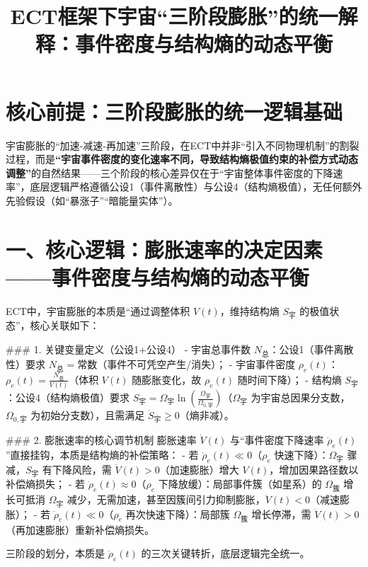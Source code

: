 \documentclass{article}
\title{ECT框架下宇宙“三阶段膨胀”的统一解释：事件密度与结构熵的动态平衡}
\author{}
\date{}
\begin{document}
\maketitle

\section*{核心前提：三阶段膨胀的统一逻辑基础}
宇宙膨胀的“加速-减速-再加速”三阶段，在ECT中并非“引入不同物理机制”的割裂过程，而是\textbf{“宇宙事件密度的变化速率不同，导致结构熵极值约束的补偿方式动态调整”}的自然结果——三个阶段的核心差异仅在于“宇宙整体事件密度的下降速率”，底层逻辑严格遵循公设1（事件离散性）与公设4（结构熵极值），无任何额外先验假设（如“暴涨子”“暗能量实体”）。


\section*{一、核心逻辑：膨胀速率的决定因素——事件密度与结构熵的动态平衡}
ECT中，宇宙膨胀的本质是“通过调整体积 \( V(t) \)，维持结构熵 \( S_{\text{宇}} \) 的极值状态”，核心关联如下：

### 1. 关键变量定义（公设1+公设4）
- 宇宙总事件数 \( N_{\text{总}} \)：公设1（事件离散性）要求 \( N_{\text{总}} = \text{常数} \)（事件不可凭空产生/消失）；
- 宇宙事件密度 \( \rho_e(t) \)：\( \rho_e(t) = \frac{N_{\text{总}}}{V(t)} \)（体积 \( V(t) \) 随膨胀变化，故 \( \rho_e(t) \) 随时间下降）；
- 结构熵 \( S_{\text{宇}} \)：公设4（结构熵极值）要求 \( S_{\text{宇}} = \Omega_{\text{宇}} \ln\left(\frac{\Omega_{\text{宇}}}{\Omega_{0,\text{宇}}}\right) \)（\( \Omega_{\text{宇}} \) 为宇宙总因果分支数，\( \Omega_{0,\text{宇}} \) 为初始分支数），且需满足 \( \dot{S}_{\text{宇}} \geq 0 \)（熵非减）。

### 2. 膨胀速率的核心调节机制
膨胀速率 \( \dot{V}(t) \) 与“事件密度下降速率 \( \dot{\rho}_e(t) \)”直接挂钩，本质是结构熵的补偿策略：
- 若 \( \dot{\rho}_e(t) \ll 0 \)（\( \rho_e \) 快速下降）：\( \Omega_{\text{宇}} \) 骤减，\( S_{\text{宇}} \) 有下降风险，需 \( \ddot{V}(t) > 0 \)（加速膨胀）增大 \( V(t) \)，增加因果路径数以补偿熵损失；
- 若 \( \dot{\rho}_e(t) \approx 0 \)（\( \rho_e \) 下降放缓）：局部事件簇（如星系）的 \( \Omega_{\text{簇}} \) 增长可抵消 \( \Omega_{\text{宇}} \) 减少，无需加速，甚至因簇间引力抑制膨胀，\( \ddot{V}(t) < 0 \)（减速膨胀）；
- 若 \( \dot{\rho}_e(t) \ll 0 \)（\( \rho_e \) 再次快速下降）：局部簇 \( \Omega_{\text{簇}} \) 增长停滞，需 \( \ddot{V}(t) > 0 \)（再加速膨胀）重新补偿熵损失。

三阶段的划分，本质是 \( \dot{\rho}_e(t) \) 的三次关键转折，底层逻辑完全统一。
\end{document}
